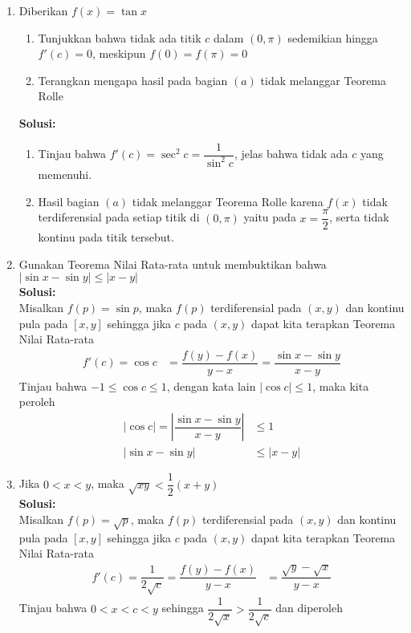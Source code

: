 \documentclass{article}
\begin{document}
\begin{enumerate}
	 \item Diberikan $f(x)=\tan x$
	 \begin{enumerate}
	 	\item Tunjukkan bahwa tidak ada titik $c$ dalam $(0,\pi)$ sedemikian hingga $f'(c)=0$, meskipun $f(0)=f(\pi)=0$
	 	\item Terangkan mengapa hasil pada bagian $(a)$ tidak melanggar Teorema Rolle
	 \end{enumerate}
	 \textbf{Solusi:}
	 \begin{enumerate}
	 	\item Tinjau bahwa $f'(c)=\sec^2 c=\dfrac{1}{\sin^2 c}$, jelas bahwa tidak ada $c$ yang memenuhi.
	 	\item Hasil bagian $(a)$ tidak melanggar Teorema Rolle karena $f(x)$ tidak terdiferensial pada setiap titik di $(0,\pi)$ yaitu pada $x=\dfrac{\pi}{2}$, serta tidak kontinu pada titik tersebut.
	 \end{enumerate}
	 \newpage
	 \item Gunakan Teorema Nilai Rata-rata untuk membuktikan bahwa $|\sin x-\sin y|\leq |x-y|$
	 \\[0.1 cm] \textbf{Solusi:}\\
	 Misalkan $f(p)=\sin p$, maka $f(p)$ terdiferensial pada $(x,y)$ dan kontinu pula pada $[x,y]$ sehingga jika $c$ pada $(x,y)$ dapat kita terapkan Teorema Nilai Rata-rata
	 \begin{align*}
	 f'(c) = \cos c &= \dfrac{f(y)-f(x)}{y-x} = \dfrac{\sin x-\sin y}{x-y}
	 \end{align*}
	 Tinjau bahwa $-1\leq \cos c\leq 1$, dengan kata lain $|\cos c|\leq 1$, maka kita peroleh 
	 \begin{align*}
	 |\cos c|= \left|\dfrac{\sin x-\sin y}{x-y}\right| &\leq 1 \\
	 |\sin x-\sin y| &\leq |x-y|
	 \end{align*}
	 \item Jika $0<x<y$, maka $\sqrt{xy}<\dfrac{1}{2}(x+y)$
	 \\[0.1 cm] \textbf{Solusi:}\\
	 Misalkan $f(p)=\sqrt{p}$, maka $f(p)$ terdiferensial pada $(x,y)$ dan kontinu pula pada $[x,y]$ sehingga jika $c$ pada $(x,y)$ dapat kita terapkan Teorema Nilai Rata-rata
	 \begin{align*}
	 f'(c) = \dfrac{1}{2\sqrt{c}} = \dfrac{f(y)-f(x)}{y-x} &= \dfrac{\sqrt{y}-\sqrt{x}}{y-x}
	 \end{align*}
	 Tinjau bahwa $0<x<c<y$ sehingga $\dfrac{1}{2\sqrt{x}}>\dfrac{1}{2\sqrt{c}}$ dan diperoleh

\end{enumerate}
\end{document}
